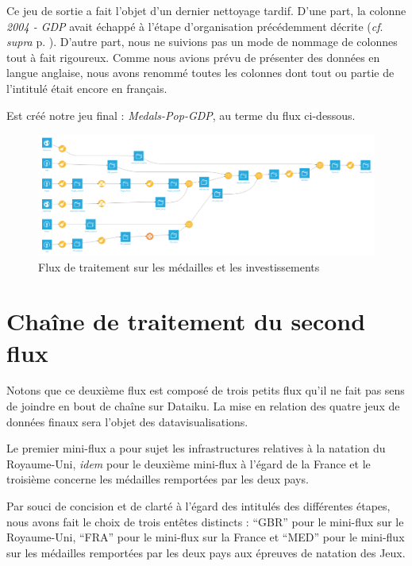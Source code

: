 \documentclass[hidelinks, 12pt]{report}
\begin{document}
Ce jeu de sortie a fait l'objet d'un dernier nettoyage tardif. D'une part, la colonne \textit{2004 - GDP} avait échappé à l'étape d'organisation précédemment décrite (\textit{cf}. \textit{supra} p. \pageref{orga}). D'autre part, nous ne suivions pas un mode de nommage de colonnes tout à fait rigoureux. Comme nous avions prévu de présenter des données en langue anglaise, nous avons renommé toutes les colonnes dont tout ou partie de l'intitulé était encore en français.

Est créé notre jeu final : \textit{Medals-Pop-GDP}, au terme du flux ci-dessous.

\begin{center}
	\begin{figure}[H]
		\centering
		\setlength{\belowcaptionskip}{-35pt}
		\includegraphics[scale=0.35]{images/flow-medals-full.png}
		\caption{Flux de traitement sur les médailles et les investissements}
	\end{figure}
\end{center}





%





\section{Chaîne de traitement du second flux}

Notons que ce deuxième flux est composé de trois petits flux qu'il ne fait pas sens de joindre en bout de chaîne sur Dataiku. La mise en relation des quatre jeux de données finaux sera l'objet des datavisualisations.

Le premier mini-flux a pour sujet les infrastructures relatives à la natation du Royaume-Uni, \textit{idem} pour le deuxième mini-flux à l'égard de la France et le troisième concerne les médailles remportées par les deux pays.

Par souci de concision et de clarté à l'égard des intitulés des différentes étapes, nous avons fait le choix de trois entêtes distincts : \enquote{GBR} pour le mini-flux sur le Royaume-Uni, \enquote{FRA} pour le mini-flux sur la France et \enquote{MED} pour le mini-flux sur les médailles remportées par les deux pays aux épreuves de natation des Jeux.
\end{document}
